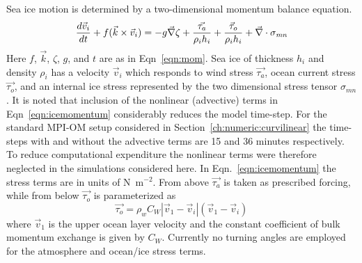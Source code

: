 Sea ice motion is determined by a two-dimensional momentum balance equation.
\begin{equation}
\label{eqn:icemomentum}
{d{\vec{v}_i} \over {dt}} + f(\vec{k}\times\vec{v}_i) =
- g\vec{\nabla}\zeta + {\vec{\tau_{a}}\over {\rho_i{h_i}}}
+ {\vec{\tau}_o \over {\rho_i h_i}} + \vec{\nabla}\cdot\sigma_{\mathit{mn}}
\end{equation}
Here $f$, $\vec{k}$, $\zeta$, $g$, and $t$ are as in Eqn~\ref{eqn:mom}.
Sea ice of thickness $h_i$ and density $\rho_i$
has a velocity $\vec{v}_i$ which responds to wind stress $\vec{\tau_{a}}$,
ocean current stress $\vec{\tau_{o}}$,
and an internal ice stress
represented by the two dimensional stress tensor $\sigma_{\mathit{mn}}$.
It is noted that inclusion of the nonlinear (advective) terms 
in Eqn~\ref{eqn:icemomentum}
considerably reduces the model time-step.
For the standard \mbox{MPI-OM} setup considered in Section~\ref{ch:numeric:curvilinear} the time-steps
with and without the advective terms are 15 and 36 minutes respectively.
To reduce computational expenditure the nonlinear terms were therefore neglected
in the simulations considered here.
In Eqn.~\ref{eqn:icemomentum} the stress terms are in units of \mbox{N m$^{-2}$}.
From above $\vec{\tau_a}$ is taken as prescribed forcing,
while from below $\vec{\tau_o}$ is parameterized as
\begin{equation}
\label{eqn:icestress}
{\vec{\tau_o}}  = \rho_w C_W 
|\vec{v}_1 - \vec{v}_i| (\vec{v}_1 - \vec{v}_i)
\end{equation}
where 
$\vec{v}_1$ is the upper ocean layer velocity
and
the constant coefficient of bulk momentum exchange is given by $C_W$.
Currently no turning angles are employed for the atmosphere and ocean/ice stress terms.

